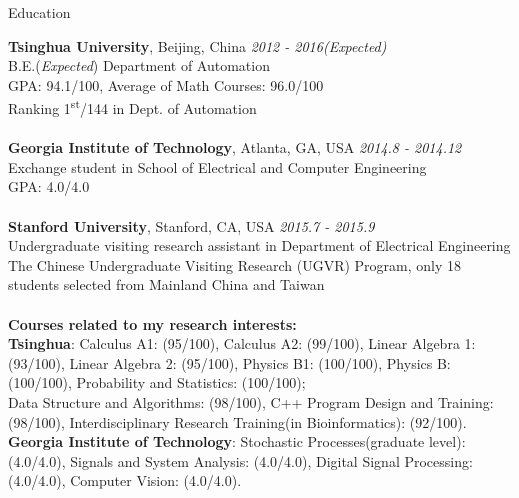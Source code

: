 \documentclass{resume} %
\begin{document}

\begin{rSection}{Education}

{\bf Tsinghua University}, Beijing, China \hfill {\em 2012 - 2016(Expected)} \\ 
B.E.({\it Expected}) Department of Automation \\
GPA: 94.1/100, Average of Math Courses: 96.0/100		\\
Ranking 1\textsuperscript{st}/144 in Dept. of Automation \\ \\
{\bf Georgia Institute of Technology}, Atlanta, GA, USA \hfill {\em 2014.8 - 2014.12} \\ 
Exchange student in School of Electrical and Computer Engineering\\
GPA: 4.0/4.0 \\ \\ 
{\bf Stanford University}, Stanford, CA, USA \hfill {\em 2015.7 - 2015.9} \\ 
Undergraduate visiting research assistant in Department of Electrical Engineering \\
The Chinese Undergraduate Visiting Research (UGVR) Program, only 18 students selected from Mainland China and Taiwan\\ \\
{\bf Courses related to my research interests:} \\ 
{\bf Tsinghua}: Calculus A1: (95/100), Calculus A2: (99/100), Linear Algebra 1: (93/100), Linear Algebra 2: (95/100), Physics B1: (100/100), Physics B: (100/100), Probability and Statistics: (100/100); \\Data Structure and Algorithms: (98/100), C++ Program Design and Training: (98/100),  Interdisciplinary Research Training(in Bioinformatics): (92/100). \\
{\bf Georgia Institute of Technology}: Stochastic Processes(graduate level): (4.0/4.0), Signals and System Analysis: (4.0/4.0), Digital Signal Processing: (4.0/4.0), Computer Vision: (4.0/4.0).

\end{rSection}

\end{document}
